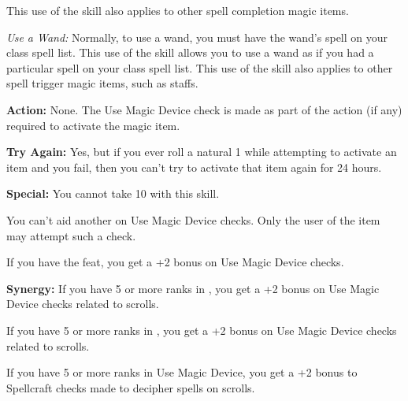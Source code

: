 This use of the skill also applies to other spell completion magic items.

\textit{Use a Wand:} Normally, to use a wand, you must have the wand's spell on 
your class spell list. This use of the skill allows you to use a wand as if you 
had a particular spell on your class spell list. This use of the skill also applies 
to other spell trigger magic items, such as staffs.

\textbf{Action:} None. The Use Magic Device check is made as part of the action 
(if any) required to activate the magic item.

\textbf{Try Again:} Yes, but if you ever roll a natural 1 while attempting to activate 
an item and you fail, then you can't try to activate that item again for 24 hours.

\textbf{Special:} You cannot take 10 with this skill.

You can't aid another on Use Magic Device checks. Only the user of the item may 
attempt such a check.

If you have the  feat, you get a +2 bonus on Use Magic Device checks.

\textbf{Synergy:} If you have 5 or more ranks in , you get a +2 bonus 
on Use Magic Device checks related to scrolls.

If you have 5 or more ranks in , you get a +2 bonus on Use Magic 
Device checks related to scrolls.

If you have 5 or more ranks in Use Magic Device, you get a +2 bonus to Spellcraft 
checks made to decipher spells on scrolls.
